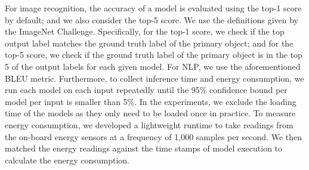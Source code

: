    For image recognition, the accuracy of a model is evaluated using the top-1 score by default; and we
also consider the top-5 score. We use the definitions given by the ImageNet Challenge. Specifically, for the top-1 score, we check if the
top output label matches the ground truth label of the primary object; and for the top-5 score, we check if the ground truth label of the
primary object is in the top 5 of the output labels for each given model. For NLP, we use the aforementioned BLEU metric. Furthermore, to
collect inference time and energy consumption, we run each model on each input repeatedly until the 95\% confidence bound per model per
input is smaller than 5\%. In the experiments, we exclude the loading time of the \CNN models as they only need to be loaded once in
practice. To measure energy consumption, we developed a lightweight runtime to take readings from the on-board energy sensors at a
frequency of 1,000 samples per second. We then matched the energy readings against the time stamps of model execution to calculate the
energy consumption.

